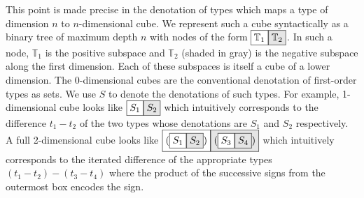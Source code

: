\documentclass[authoryear,preprint]{sigplanconf}
\newcommand{\cubt}{\mathbb{T}}
\newcommand{\nodet}[2]{\fcolorbox{black}{white}{$#1$}\fcolorbox{black}{gray!20}{$#2$}}
\begin{document}
This point is made precise in the denotation of types which maps a type of
dimension $n$ to $n$-dimensional cube. We represent such a cube syntactically
as a binary tree of maximum depth $n$ with nodes of the form
$\nodet{\cubt_1}{\cubt_2}$. In such a node, $\cubt_1$ is the positive
subspace and $\cubt_2$ (shaded in gray) is the negative subspace along the
first dimension. Each of these subspaces is itself a cube of a lower
dimension. The $0$-dimensional cubes are the conventional denotation of
first-order types as sets. We use $S$ to denote the denotations of such
types. For example, 1-dimensional cube looks like $\nodet{S_1}{S_2}$ which
intuitively corresponds to the difference $t_1 - t_2$ of the two types whose
denotations are $S_1$ and $S_2$ respectively. A full 2-dimensional cube looks
like $\nodet{(\nodet{S_1}{S_2})}{(\nodet{S_3}{S_4})}$ which intuitively
corresponds to the iterated difference of the appropriate types
$(t_1-t_2)-(t_3-t_4)$ where the product of the successive signs from the
outermost box encodes the sign.
\end{document}
